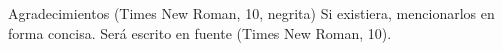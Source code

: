 Agradecimientos (Times New Roman, 10, negrita) 
Si existiera, mencionarlos en forma concisa. Será escrito en fuente (Times New Roman, 10).

